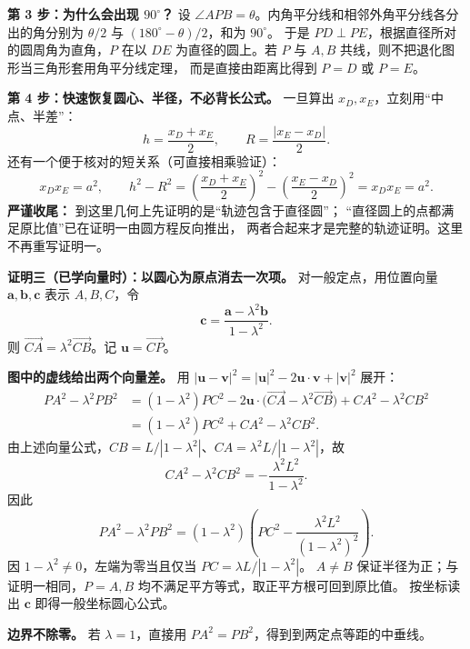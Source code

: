 \begin{proofbox}
\textbf{第 3 步：为什么会出现 $90^\circ$？}
设 $\angle APB=\theta$。内角平分线和相邻外角平分线各分出的角分别为
$\theta/2$ 与 $(180^\circ-\theta)/2$，和为 $90^\circ$。
于是 $PD\perp PE$，根据直径所对的圆周角为直角，$P$ 在以 $DE$
为直径的圆上。若 $P$ 与 $A,B$ 共线，则不把退化图形当三角形套用角平分线定理，
而是直接由距离比得到 $P=D$ 或 $P=E$。

\textbf{第 4 步：快速恢复圆心、半径，不必背长公式。}
一旦算出 $x_D,x_E$，立刻用“中点、半差”：
\[
 h=\frac{x_D+x_E}{2},\qquad R=\frac{|x_E-x_D|}{2}.
\]
还有一个便于核对的短关系（可直接相乘验证）：
\[
 \boxed{x_Dx_E=a^2},\qquad
 h^2-R^2=\left(\frac{x_D+x_E}{2}\right)^2-
             \left(\frac{x_E-x_D}{2}\right)^2=x_Dx_E=a^2.
\]
\textbf{严谨收尾：} 到这里几何上先证明的是“轨迹包含于直径圆”；
“直径圆上的点都满足原比值”已在证明一由圆方程反向推出，
两者合起来才是完整的轨迹证明。这里不再重写证明一。


\tcbbreak
\textbf{证明三（已学向量时）：以圆心为原点消去一次项。}
对一般定点，用位置向量 $\mathbf a,\mathbf b,\mathbf c$ 表示 $A,B,C$，令
\[
 \mathbf c=\frac{\mathbf a-\lambda^2\mathbf b}{1-\lambda^2}.
\]
则 $\overrightarrow{CA}=\lambda^2\overrightarrow{CB}$。记 $\mathbf u=\overrightarrow{CP}$。

\textbf{图中的虚线给出两个向量差。}
用 $|\mathbf u-\mathbf v|^2=|\mathbf u|^2-2\mathbf u\cdot\mathbf v+|\mathbf v|^2$ 展开：
\[
\begin{aligned}
 PA^2-\lambda^2PB^2
 &=(1-\lambda^2)PC^2
 -2\mathbf u\cdot\bigl(\overrightarrow{CA}-\lambda^2\overrightarrow{CB}\bigr)
 +CA^2-\lambda^2CB^2\\
 &=(1-\lambda^2)PC^2+CA^2-\lambda^2CB^2.
\end{aligned}
\]
由上述向量公式，$CB=L/|1-\lambda^2|$、$CA=\lambda^2L/|1-\lambda^2|$，故
\[
 CA^2-\lambda^2CB^2=-\frac{\lambda^2L^2}{1-\lambda^2}.
\]
因此
\[
 PA^2-\lambda^2PB^2
 =(1-\lambda^2)\left(PC^2-\frac{\lambda^2L^2}{(1-\lambda^2)^2}\right).
\]
因 $1-\lambda^2\ne0$，左端为零当且仅当 $PC=\lambda L/|1-\lambda^2|$。
$A\ne B$ 保证半径为正；与证明一相同，$P=A,B$ 均不满足平方等式，取正平方根可回到原比值。
按坐标读出 $\mathbf c$ 即得一般坐标圆心公式。

\textbf{边界不除零。} 若 $\lambda=1$，直接用 $PA^2=PB^2$，得到到两定点等距的中垂线。
\end{proofbox}
